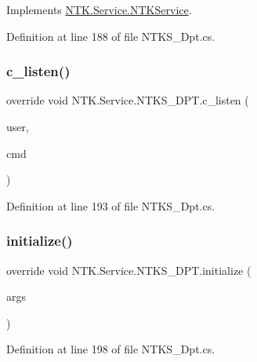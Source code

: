Implements \mbox{\hyperlink{class_n_t_k_1_1_service_1_1_n_t_k_service_a8c2fd33b41da5a4edf9911682dfd36cd}{N\+T\+K.\+Service.\+N\+T\+K\+Service}}.



Definition at line 188 of file N\+T\+K\+S\+\_\+\+Dpt.\+cs.

\mbox{\label{class_n_t_k_1_1_service_1_1_n_t_k_s___d_p_t_ae37a659d2cf01cd5bb8ab1ca5ccdb7a2}} 
\subsubsection{\texorpdfstring{c\_listen()}{c\_listen()}}
{\footnotesize\ttfamily override void N\+T\+K.\+Service.\+N\+T\+K\+S\+\_\+\+D\+P\+T.\+c\+\_\+listen (\begin{DoxyParamCaption}\item[{\mbox{\hyperlink{class_n_t_k_1_1_n_t_k_user}{N\+T\+K\+User}}}]{user,  }\item[{string}]{cmd }\end{DoxyParamCaption})}



Definition at line 193 of file N\+T\+K\+S\+\_\+\+Dpt.\+cs.

\mbox{\label{class_n_t_k_1_1_service_1_1_n_t_k_s___d_p_t_af34ae802a92ae0ddd7192da7306717e4}} 
\subsubsection{\texorpdfstring{initialize()}{initialize()}}
{\footnotesize\ttfamily override void N\+T\+K.\+Service.\+N\+T\+K\+S\+\_\+\+D\+P\+T.\+initialize (\begin{DoxyParamCaption}\item[{params object \mbox{[}$\,$\mbox{]}}]{args }\end{DoxyParamCaption})}



Definition at line 198 of file N\+T\+K\+S\+\_\+\+Dpt.\+cs.

\mbox{\label{class_n_t_k_1_1_service_1_1_n_t_k_s___d_p_t_ac4329c0824028ac2ccb9020cb52aa0f6}} 
